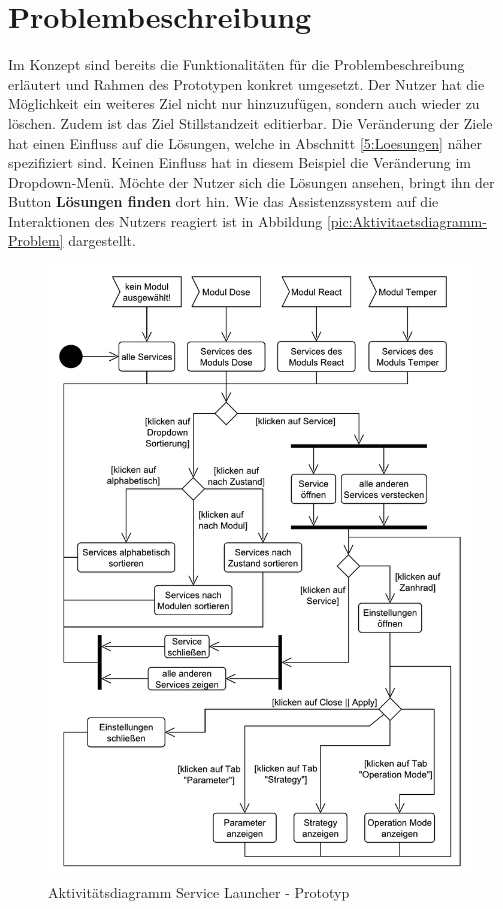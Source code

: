 \section{Problembeschreibung}
\label{5:Problembeschreibung}
Im Konzept sind bereits die Funktionalitäten für die Problembeschreibung erläutert und Rahmen des Prototypen konkret umgesetzt. Der Nutzer hat die Möglichkeit ein weiteres Ziel nicht nur hinzuzufügen, sondern auch wieder zu löschen. Zudem ist das Ziel Stillstandzeit editierbar. Die Veränderung der Ziele hat einen Einfluss auf die Lösungen, welche in Abschnitt \ref{5:Loesungen} näher spezifiziert sind. Keinen Einfluss hat in diesem Beispiel die Veränderung im Dropdown-Menü. Möchte der Nutzer sich die Lösungen ansehen, bringt ihn der Button \textbf{Lösungen finden} dort hin. Wie das Assistenzssystem auf die Interaktionen des Nutzers reagiert ist in Abbildung \ref{pic:Aktivitaetsdiagramm-Problem} dargestellt.

\begin{figure}[htbp]
\centering
\includegraphics[scale=0.65]{DA_files/UML/Prototyp/Aktivitaetsdiagramm-ServiceLauchner.pdf}
\caption{Aktivitätsdiagramm Service Launcher - Prototyp}
\label{pic:Aktivitaetsdiagramm-ServiceLauncher}
\end{figure}

